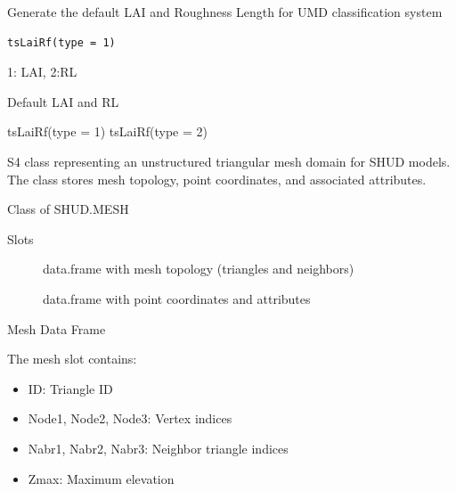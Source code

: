\documentclass[a4paper]{book}
\begin{document}
%
\begin{Description}\relax
Generate the default LAI and Roughness Length for UMD classification system
\end{Description}
%
\begin{Usage}
\begin{verbatim}
tsLaiRf(type = 1)
\end{verbatim}
\end{Usage}
%
\begin{Arguments}
\begin{ldescription}
\item[\code{type}] 1: LAI, 2:RL
\end{ldescription}
\end{Arguments}
%
\begin{Value}
Default LAI and RL
\end{Value}
%
\begin{Examples}
\begin{ExampleCode}
tsLaiRf(type = 1)
tsLaiRf(type = 2)
\end{ExampleCode}
\end{Examples}
%
\begin{Description}\relax
S4 class representing an unstructured triangular mesh domain for SHUD models.
The class stores mesh topology, point coordinates, and associated attributes.
\end{Description}
%
\begin{Value}
Class of SHUD.MESH
\end{Value}
%
\begin{Section}{Slots}

\begin{description}

\item[] data.frame with mesh topology (triangles and neighbors)

\item[] data.frame with point coordinates and attributes

\end{description}
\end{Section}
%
\begin{Section}{Mesh Data Frame}

The mesh slot contains:
\begin{itemize}

\item{} ID: Triangle ID
\item{} Node1, Node2, Node3: Vertex indices
\item{} Nabr1, Nabr2, Nabr3: Neighbor triangle indices
\item{} Zmax: Maximum elevation

\end{itemize}

\end{Section}
\end{document}
